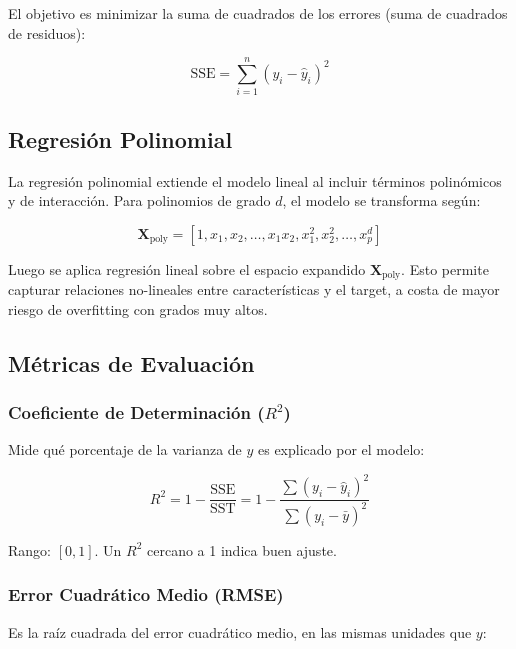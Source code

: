 \documentclass[11pt,a4paper]{article}
\begin{document}
El objetivo es minimizar la suma de cuadrados de los errores (suma de cuadrados de residuos):

\begin{equation}
\text{SSE} = \sum_{i=1}^{n} (y_i - \hat{y}_i)^2
\end{equation}

\subsection{Regresión Polinomial}

La regresión polinomial extiende el modelo lineal al incluir términos polinómicos y de interacción. 
Para polinomios de grado $d$, el modelo se transforma según:

\begin{equation}
\mathbf{X}_{\text{poly}} = \left[ 1, x_1, x_2, \ldots, x_1 x_2, x_1^2, x_2^2, \ldots, x_p^d \right]
\end{equation}

Luego se aplica regresión lineal sobre el espacio expandido $\mathbf{X}_{\text{poly}}$. 
Esto permite capturar relaciones no-lineales entre características y el target, 
a costa de mayor riesgo de overfitting con grados muy altos.

\subsection{Métricas de Evaluación}

\subsubsection{Coeficiente de Determinación ($R^2$)}

Mide qué porcentaje de la varianza de $y$ es explicado por el modelo:

\begin{equation}
R^2 = 1 - \frac{\text{SSE}}{\text{SST}} = 1 - \frac{\sum (y_i - \hat{y}_i)^2}{\sum (y_i - \bar{y})^2}
\end{equation}

Rango: $[0, 1]$. Un $R^2$ cercano a 1 indica buen ajuste.

\subsubsection{Error Cuadrático Medio (RMSE)}

Es la raíz cuadrada del error cuadrático medio, en las mismas unidades que $y$:
\end{document}
